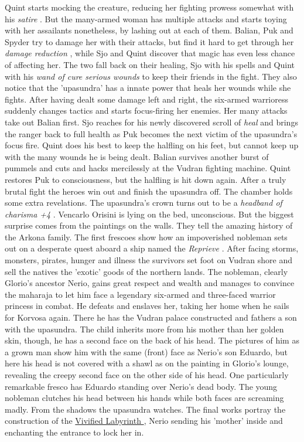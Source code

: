 Quint starts mocking the creature, reducing her fighting prowess somewhat with his {\itshape satire} . But the many-armed woman has multiple attacks and starts toying with her assailants nonetheless, by lashing out at each of them. Balian, Puk and Spyder try to damage her with their attacks, but find it hard to get through her  {\itshape damage reduction} , while Sjo and Quint discover that magic has even less chance of affecting her. The two fall back on their healing, Sjo with his spells and Quint with his  {\itshape wand of cure serious wounds} to keep their friends in the fight. They also notice that the 'upasundra' has a innate power that heals her wounds while she fights. After having dealt some damage left and right, the six-armed warrioress suddenly changes tactics and starts focus-firing her enemies. Her many attacks take out Balian first. Sjo reaches for his newly discovered scroll of  {\itshape heal} and brings the ranger back to full health as Puk becomes the next victim of the upasundra's focus fire. Quint does his best to keep the halfling on his feet, but cannot keep up with the many wounds he is being dealt. Balian survives another burst of pummels and cuts and hacks mercilessly at the Vudran fighting machine. Quint restores Puk to consciousness, but the halfling is hit down again. After a truly brutal fight the heroes win out and finish the upasundra off. The chamber holds some extra revelations. The upasundra's crown turns out to be a {\itshape headband of charisma +4} . Vencarlo Orisini is lying on the bed, unconscious. But the biggest surprise comes from the paintings on the walls. They tell the amazing history of the Arkona family. The first frescoes show how an impoverished nobleman sets out on a desperate quest aboard a ship named the  {\itshape Reprieve} . After facing storms, monsters, pirates, hunger and illness the survivors set foot on Vudran shore and sell the natives the 'exotic' goods of the northern lands. The nobleman, clearly Glorio's ancestor Nerio, gains great respect and wealth and manages to convince the maharaja to let him face a legendary six-armed and three-faced warrior princess in combat. He defeats and enslaves her, taking her home when he sails for Korvosa again. There he has the Vudran palace constructed and fathers a son with the upasundra. The child inherits more from his mother than her golden skin, though, he has a second face on the back of his head. The pictures of him as a grown man show him with the same (front) face as Nerio's son Eduardo, but here his head is not covered with a shawl as on the painting in Glorio's lounge, revealing the creepy second face on the other side of his head. One particularly remarkable fresco has Eduardo standing over Nerio's dead body. The young nobleman clutches his head between his hands while both faces are screaming madly. From the shadows the upasundra watches. The final works portray the construction of the \hyperref[fig:Overview-of-the-Vivified-labyrinth-565302683]{ Vivified Labyrinth } , Nerio sending his 'mother' inside and enchanting the entrance to lock her in. \\


